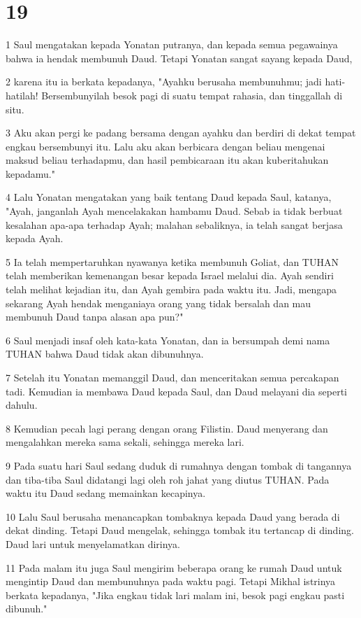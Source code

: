 \chapter{19}

\par 1 Saul mengatakan kepada Yonatan putranya, dan kepada semua pegawainya bahwa ia hendak membunuh Daud. Tetapi Yonatan sangat sayang kepada Daud,
\par 2 karena itu ia berkata kepadanya, "Ayahku berusaha membunuhmu; jadi hati-hatilah! Bersembunyilah besok pagi di suatu tempat rahasia, dan tinggallah di situ.
\par 3 Aku akan pergi ke padang bersama dengan ayahku dan berdiri di dekat tempat engkau bersembunyi itu. Lalu aku akan berbicara dengan beliau mengenai maksud beliau terhadapmu, dan hasil pembicaraan itu akan kuberitahukan kepadamu."
\par 4 Lalu Yonatan mengatakan yang baik tentang Daud kepada Saul, katanya, "Ayah, janganlah Ayah mencelakakan hambamu Daud. Sebab ia tidak berbuat kesalahan apa-apa terhadap Ayah; malahan sebaliknya, ia telah sangat berjasa kepada Ayah.
\par 5 Ia telah mempertaruhkan nyawanya ketika membunuh Goliat, dan TUHAN telah memberikan kemenangan besar kepada Israel melalui dia. Ayah sendiri telah melihat kejadian itu, dan Ayah gembira pada waktu itu. Jadi, mengapa sekarang Ayah hendak menganiaya orang yang tidak bersalah dan mau membunuh Daud tanpa alasan apa pun?"
\par 6 Saul menjadi insaf oleh kata-kata Yonatan, dan ia bersumpah demi nama TUHAN bahwa Daud tidak akan dibunuhnya.
\par 7 Setelah itu Yonatan memanggil Daud, dan menceritakan semua percakapan tadi. Kemudian ia membawa Daud kepada Saul, dan Daud melayani dia seperti dahulu.
\par 8 Kemudian pecah lagi perang dengan orang Filistin. Daud menyerang dan mengalahkan mereka sama sekali, sehingga mereka lari.
\par 9 Pada suatu hari Saul sedang duduk di rumahnya dengan tombak di tangannya dan tiba-tiba Saul didatangi lagi oleh roh jahat yang diutus TUHAN. Pada waktu itu Daud sedang memainkan kecapinya.
\par 10 Lalu Saul berusaha menancapkan tombaknya kepada Daud yang berada di dekat dinding. Tetapi Daud mengelak, sehingga tombak itu tertancap di dinding. Daud lari untuk menyelamatkan dirinya.
\par 11 Pada malam itu juga Saul mengirim beberapa orang ke rumah Daud untuk mengintip Daud dan membunuhnya pada waktu pagi. Tetapi Mikhal istrinya berkata kepadanya, "Jika engkau tidak lari malam ini, besok pagi engkau pasti dibunuh."

